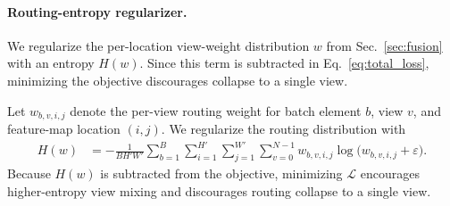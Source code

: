 \paragraph{Routing-entropy regularizer.}
We regularize the per-location view-weight distribution \(w\) from Sec.~\ref{sec:fusion} with an entropy \(H(w)\).
Since this term is subtracted in Eq.~\ref{eq:total_loss}, minimizing the objective discourages collapse to a single view.




Let \(w_{b,v,i,j}\) denote the per-view routing weight for batch element
\(b\), view \(v\), and feature-map location \((i,j)\). We regularize the
routing distribution with
\[
\begin{aligned}
H(w) &=
-\frac{1}{B H' W'}
\sum_{b=1}^{B}
\sum_{i=1}^{H'}
\sum_{j=1}^{W'}
\sum_{v=0}^{N-1}
w_{b,v,i,j}
\log\!\bigl(w_{b,v,i,j}+\varepsilon\bigr).
\end{aligned}
\]
Because \(H(w)\) is subtracted from the objective, minimizing
\(\mathcal{L}\) encourages higher-entropy view mixing and discourages
routing collapse to a single view.





